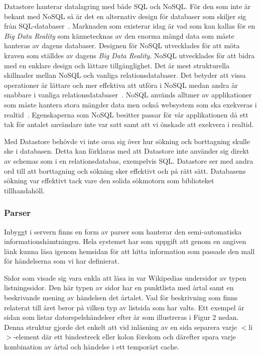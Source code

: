 \documentclass[a4paper, 11pt]{article}
\begin{document}
Datastore hanterar datalagring med både SQL och NoSQL. För den som inte är bekant med NoSQL så är det en alternativ design för databaser som skiljer sig från SQL-databaser~\cite{nosql}. Marknaden som existerar idag är vad som kan kallas för en \textit{Big Data Reality} som kännetecknas av den enorma mängd data som måste hanteras av dagens databaser. Designen för NoSQL utvecklades för att möta kraven som ställdes av dagens \textit{Big Data Reality}. NoSQL utvecklades för att bidra med en enklare design och lättare tillgänglighet. Det är mest strukturella skillnader mellan NoSQL och vanliga relationsdatabaser. Det betyder att vissa operationer är lättare och mer effektiva att utföra i NoSQL medan andra är snabbare i vanliga relationsdatabaser~\cite[1--3]{nosqlfacts}. NoSQL används alltmer av applikationer som måste hantera stora mängder data men också websystem som ska exekveras i realtid~\cite{nosqlcloud}. Egenskaperna som NoSQL besitter passar för vår applikationen då ett tak för antalet användare inte var satt samt att vi önskade att exekvera i realtid.

Med Datastore behövde vi inte oroa sig över hur sökning och borttagning skulle ske i databasen. Detta kan förklaras med att Datastore inte använder sig direkt av schemas som i en relationsdatabas, exempelvis SQL. Datastore ser med andra ord till att borttagning och sökning sker effektivt och på rätt sätt. Databasens sökning var effektivt tack vare den solida sökmotorn som biblioteket tillhandahöll.

\subsubsection{Parser} \label{crawler}
Inbyggt i servern finns en form av parser som hanterar den semi-automatiska informationshämtningen. Hela systemet har som uppgift att genom en angiven länk kunna läsa igenom hemsidan för att hitta information som passade den mall för händelserna som vi har definierat. 

Sidor som visade sig vara enkla att läsa in var Wikipedias undersidor av typen listningssidor. Den här typen av sidor har en punktlista med årtal samt en beskrivande mening av händelsen det årtalet. Vad för beskrivning som finns relaterat till året beror på vilken typ av listsida som har valts. Ett exempel är sidan som listar datorspelshändelser efter år som illustreras i Figur 2 nedan.
Denna struktur gjorde det enkelt att vid inläsning av en sida separera varje $<$li$>$-element där ett bindestreck eller kolon förekom och därefter spara varje kombination av årtal och händelse i ett temporärt cache.
\end{document}
